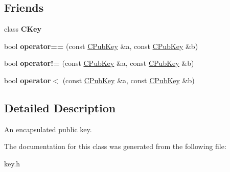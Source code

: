 \subsection*{Friends}
\begin{DoxyCompactItemize}
\item 
\mbox{\label{class_c_pub_key_a9f17a280a7dac5d27a78fe70ef7d9261}} 
class {\bfseries C\+Key}
\item 
\mbox{\label{class_c_pub_key_a864b3cdcb46fb85c1fc07e0686cc3a31}} 
bool {\bfseries operator==} (const \mbox{\hyperlink{class_c_pub_key}{C\+Pub\+Key}} \&a, const \mbox{\hyperlink{class_c_pub_key}{C\+Pub\+Key}} \&b)
\item 
\mbox{\label{class_c_pub_key_af660fd5a8d213211dfff37a2296d09e1}} 
bool {\bfseries operator!=} (const \mbox{\hyperlink{class_c_pub_key}{C\+Pub\+Key}} \&a, const \mbox{\hyperlink{class_c_pub_key}{C\+Pub\+Key}} \&b)
\item 
\mbox{\label{class_c_pub_key_af814095b2c92bedd96a83a0811d52da9}} 
bool {\bfseries operator$<$} (const \mbox{\hyperlink{class_c_pub_key}{C\+Pub\+Key}} \&a, const \mbox{\hyperlink{class_c_pub_key}{C\+Pub\+Key}} \&b)
\end{DoxyCompactItemize}


\subsection{Detailed Description}
An encapsulated public key. 

The documentation for this class was generated from the following file\+:\begin{DoxyCompactItemize}
\item 
key.\+h\end{DoxyCompactItemize}
